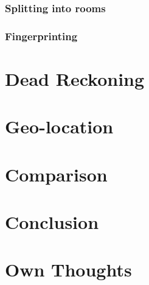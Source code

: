 \documentclass[12pt,a4paper]{article}
\begin{document}
\subsubsection{Splitting into rooms}

\subsubsection{Fingerprinting}



\section{Dead Reckoning}


\section{Geo-location}

\section{Comparison}

\section{Conclusion}

\section{Own Thoughts}




\end{document}
